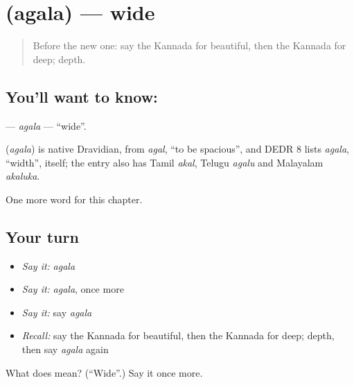 \section[\texorpdfstring{\kn{ಅಗಲ} (agala)}{ಅಗಲ (agala)}]{ (agala) — wide}

\label{lesson:KA-C142-agala}



\begin{quote}
Before the new one: say the Kannada for beautiful, then the Kannada for deep; depth.
\end{quote}

\subsection*{You'll want to know: }
\textbf{} — \emph{agala} — \textquotedblleft{}wide\textquotedblright{}.

\begin{cousinweb}
\textbf{} (\emph{agala}) is native Dravidian, from \emph{agal}, \textquotedblleft{}to be spacious\textquotedblright{}, and DEDR 8 lists \emph{agala}, \textquotedblleft{}width\textquotedblright{}, itself; the entry also has Tamil \emph{akal}, Telugu \emph{agalu} and Malayalam \emph{akaluka}.
\end{cousinweb}

\begin{grammarlens}[title={What you've built}]
One more word for this chapter.
\end{grammarlens}

\subsection*{Your turn}
\begin{itemize}
\raggedright
  \item \emph{Say it:} \emph{agala}
  \item \emph{Say it:} \emph{agala}, once more
  \item \emph{Say it:} say \emph{agala}
  \item \emph{Recall:} say the Kannada for beautiful, then the Kannada for deep; depth, then say \emph{agala} again
\end{itemize}

\begin{tcolorbox}[breakable,colback=teal!4,colframe=teal!35!black,title={Before you move on}]
What does  mean? (\textquotedblleft{}Wide\textquotedblright{}.) Say it once more.
\end{tcolorbox}
